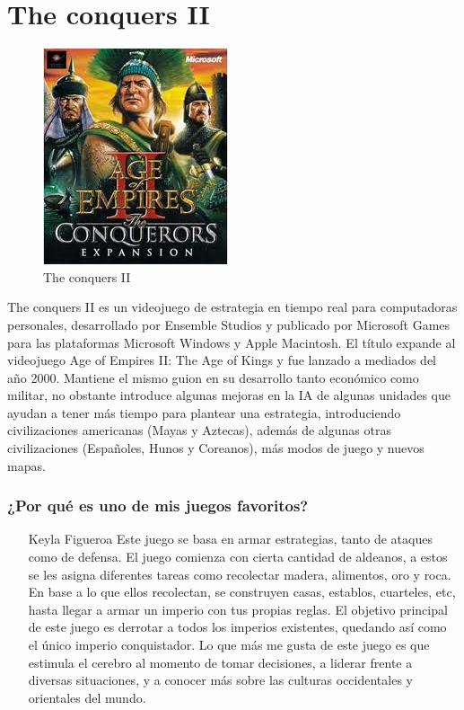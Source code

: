 \section{The conquers II}

\begin{figure}[htbp]
\begin{center}
\includegraphics[width=.37\textwidth]{./imagenes/conquers.jpg}
\caption{The conquers II}
\label{The conquers II}
\end{center}
\end{figure}
The conquers II  es un videojuego de estrategia en tiempo real para computadoras personales, desarrollado por Ensemble Studios y publicado por Microsoft Games para las plataformas Microsoft Windows y Apple Macintosh. El título expande al videojuego Age of Empires II: The Age of Kings y fue lanzado a mediados del año 2000.
Mantiene el mismo guion en su desarrollo tanto económico como militar, no obstante introduce algunas mejoras en la IA de algunas unidades que ayudan a tener más tiempo para plantear una estrategia, introduciendo civilizaciones americanas (Mayas y Aztecas), además de algunas otras civilizaciones (Españoles, Hunos y Coreanos), más modos de juego y nuevos mapas.

\subsubsection{¿Por qué es uno de mis juegos favoritos?}
\begin{itemize}
\item[Keyla Figueroa] Este juego se basa en armar estrategias, tanto de ataques como de defensa. 
El juego comienza con cierta cantidad de aldeanos, a estos se les asigna diferentes tareas como recolectar madera, alimentos, oro y roca. En base a lo que ellos recolectan, se construyen casas, establos, cuarteles, etc, hasta llegar a armar un imperio con tus propias reglas. El objetivo principal de este juego es derrotar a todos los imperios existentes, quedando así como el único imperio conquistador.
Lo que más me gusta de este juego es que estimula el cerebro al momento de tomar decisiones, a liderar frente a diversas situaciones, y a conocer más sobre las culturas occidentales y orientales del mundo. 
\end{itemize}